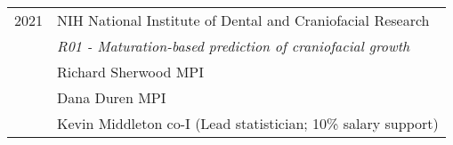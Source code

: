 \begin{longtable}{@{}lX@{}}
    2021 & NIH National Institute of Dental and Craniofacial Research\\
         & \emph{R01 - Maturation-based prediction of craniofacial growth}\\
         & Richard Sherwood MPI\\
         & Dana Duren MPI\\
         & Kevin Middleton co-I (Lead statistician; 10\% salary support)\\[0.5pc]
\end{longtable}
